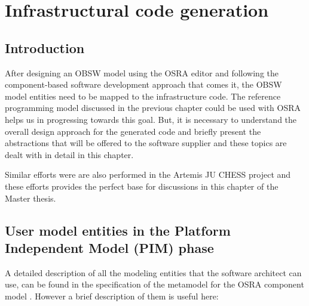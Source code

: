 
\chapter{Infrastructural code generation}
\label{chap: Code generation}
\section{Introduction}
After designing an OBSW model using the OSRA editor and following the component-based software development approach that comes it, the OBSW model entities need to be mapped to the infrastructure code. The reference programming model discussed in the previous chapter could be used with OSRA helps us in progressing towards this goal. But, it is necessary to understand the overall design approach for the generated code and briefly present the abstractions that will be offered to the software supplier and these topics are dealt with in detail in this chapter.

Similar efforts were are also performed in the Artemis JU CHESS project \cite{EvoRAVCodeAr} and these efforts provides the perfect base for discussions in this chapter of the Master thesis.   

\section{User model entities in the Platform Independent Model (PIM) phase}
A detailed description of all the modeling entities that the software architect can use, can be found in the specification of the metamodel for the OSRA component model \cite{SpecMetamodel}. However a brief description of them is useful here:
 
